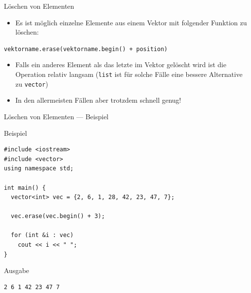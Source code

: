 \documentclass[presentation]{beamer}
\begin{document}
\begin{frame}[label={sec:org231b652},fragile]{Löschen von Elementen}
 \begin{itemize}
\item Es ist möglich \alert{einzelne Elemente} aus einem Vektor mit folgender
Funktion zu \alert{löschen}:
\end{itemize}
{\color{solarizedYellow}\verb!vektorname.erase(vektorname.begin() + position)!}
\begin{itemize}
\item Falls ein anderes Element als das letzte im Vektor gelöscht wird ist
die Operation \alert{relativ langsam} ({\color{solarizedYellow}\verb!list!} ist für solche Fälle eine
bessere Alternative zu {\color{solarizedYellow}\verb!vector!})
\item In den allermeisten Fällen aber trotzdem \alert{schnell genug}!
\end{itemize}
\end{frame}

\begin{frame}[label={sec:orgf6a03cd},fragile]{Löschen von Elementen --- Beispiel}
 \begin{block}{Beispiel}
\begin{verbatim}
#include <iostream>
#include <vector>
using namespace std;

int main() {
  vector<int> vec = {2, 6, 1, 28, 42, 23, 47, 7};

  vec.erase(vec.begin() + 3);

  for (int &i : vec)
    cout << i << " ";
}
\end{verbatim}
\end{block}

\begin{block}{Ausgabe}
\begin{verbatim}
2 6 1 42 23 47 7
\end{verbatim}
\end{block}
\end{frame}
\end{document}
